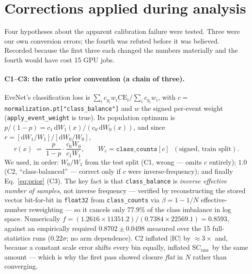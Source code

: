 \documentclass[11pt]{article}
\newcommand{\IC}{\ensuremath{\mathrm{IC}}}
\newcommand{\SCr}{\ensuremath{\mathrm{SC_{rms}}}}
\begin{document}
\section{Corrections applied during analysis}
\label{sec:corr}

Four hypotheses about the apparent calibration failure were tested. Three were our own
conversion errors; the fourth was refuted before it was believed. Recorded because the
first three each changed the numbers materially and the fourth would have cost 15 GPU jobs.

\paragraph{C1--C3: the ratio prior convention (a chain of three).} EveNet's classification
loss is
$\sum_i c_{y_i} w_i \mathrm{CE}_i / \sum_i c_{y_i} w_i$, with
$c = $ \texttt{normalization.pt["class\_balance"]} and $w$ the signed per-event weight
(\texttt{apply\_event\_weight} is true). Its population optimum is
$p/(1-p) = c_1\,\mathrm{d}W_1(x) / (c_0\,\mathrm{d}W_0(x))$, and since
$r = [\mathrm{d}W_1/W_1]/[\mathrm{d}W_0/W_0]$,
%
\begin{equation}
r(x) \;=\; \frac{p}{1-p}\cdot\frac{c_0 W_0}{c_1 W_1},
\qquad W_c = \texttt{class\_counts}[c] \;\;(\text{signed, train split}).
\label{eq:prior}
\end{equation}
%
We used, in order: $W_0/W_1$ from the test split (C1, wrong --- omits $c$ entirely);
$1.0$ (C2, ``class-balanced'' --- correct only if $c$ were inverse-frequency); and finally
Eq.~\eqref{eq:prior} (C3). The key fact is that \texttt{class\_balance} is \emph{inverse
effective number of samples}, not inverse frequency --- verified by reconstructing the
stored vector bit-for-bit in \texttt{float32} from \texttt{class\_counts} via
$\beta = 1-1/N$ effective-number reweighting --- so it cancels only 77.9\% of the class
imbalance in log space. Numerically
$f = (1.2616\times11351.2)/(0.7384\times22569.1) = \mathbf{0.8593}$, against an empirically
required $0.8702 \pm 0.0498$ measured over the 15 full-statistics runs
($0.22\sigma$; no arm dependence). C2 inflated $|\IC|$ by ${\approx}3\times$ and, because a
constant scale error shifts every bin equally, inflated \SCr\ by the same amount --- which
is why the first pass showed closure \emph{flat} in $N$ rather than converging.
\end{document}
